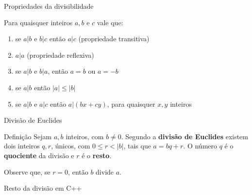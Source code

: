 \begin{frame}[fragile]{Propriedades da divisibilidade}

    Para quaisquer inteiros $a, b$ e $c$ vale que:

    \begin{enumerate}
        \item se $a|b$ e $b|c$ então $a|c$ (propriedade transitiva)
        \item $a|a$ (propriedade reflexiva)
        \item se $a|b$ e $b|a$, então $a = b$ ou $a = -b$
        \item se $a|b$ então $|a|\leq |b|$
        \item se $a|b$ e $a|c$ então $a|(bx + cy)$, para quaisquer $x,y$ inteiros
    \end{enumerate}

\end{frame}

\begin{frame}[fragile]{Divisão de Euclides}

    \begin{block}{Definição}
        Sejam $a,b$ inteiros, com $b \neq 0$. Segundo a \textbf{divisão de Euclides} existem dois inteiros $q,r$, únicos, com $0 \leq r < |b|$, tais que $a = bq + r$. O número $q$ é o \textbf{quociente} da divisão e $r$ é o \textbf{resto}.

    \end{block}

    \vspace{0.2in}

    Observe que, se $r = 0$, então $b$ divide $a$.
\end{frame}


\begin{frame}[fragile]{Resto da divisão em C++}


\end{frame}

